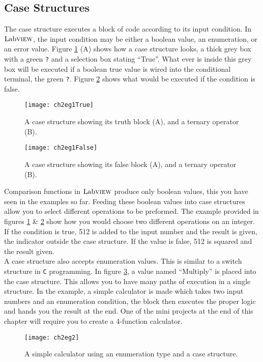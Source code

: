 \subsection{Case Structures}
The case structure executes a block of code according to its input condition. In $\text{Lab}\textsc{view}$, the input condition may be either a boolean value, an enumeration, or an error value. Figure \ref{ch2egTrue} (A) shows how a case structure looks, a thick grey box with a green \texttt{?} and a selection box stating ``True''. What ever is inside this grey box will be executed if a boolean true value is wired into the conditional terminal, the green \texttt{?}. Figure \ref{ch2egFalse} shows what would be executed if the condition is false.\\
\begin{figure}
	\centering
	\texttt{[image: ch2eg1True]}
	\caption{A case structure showing its truth block (A), and a ternary operator (B).}
	\label{ch2egTrue}
\end{figure}
\begin{figure}
	\centering
	\texttt{[image: ch2eg1False]}
\caption{A case structure showing its false block (A), and a ternary operator (B).}
\label{ch2egFalse}
\end{figure}

Comparison functions in $\text{Lab}\textsc{view}$ produce only boolean values, this you have seen in the examples so far. Feeding these boolean values into case structures allow you to select different operations to be preformed. The example provided in figures \ref{ch2egTrue} \& \ref{ch2egFalse} show how you would choose two different operations on an integer. If the condition is true, 512 is added to the input number and the result is given, the indicator outside the case structure.  If the value is false, 512 is squared and the result given.\\

A case structure also accepts enumeration values. This is similar to a switch structure in \texttt{C} programming. In figure \ref{ch2eg2}, a value named ``Multiply'' is placed into the case structure. This allows you to have many paths of execution in a single structure. In the example, a simple calculator is made which takes two input numbers and an enumeration condition, the block then executes the proper logic and hands you the result at the end. One of the mini projects at the end of this chapter will require you to create a 4-function calculator.\\
\begin{figure}
	\centering
	\texttt{[image: ch2eg2]}
\caption{A simple calculator using an enumeration type and a case structure.}
\label{ch2eg2}
\end{figure}

